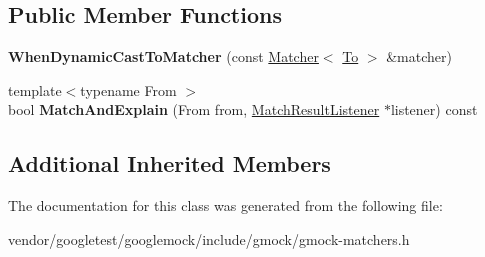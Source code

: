 \subsection*{Public Member Functions}
\begin{DoxyCompactItemize}
\item 
\mbox{\label{classtesting_1_1internal_1_1_when_dynamic_cast_to_matcher_a44e444d218197f8180c5ac7fca135f9a}} 
{\bfseries When\+Dynamic\+Cast\+To\+Matcher} (const \hyperlink{classtesting_1_1_matcher}{Matcher}$<$ \hyperlink{classtesting_1_1internal_1_1_to}{To} $>$ \&matcher)
\item 
\mbox{\label{classtesting_1_1internal_1_1_when_dynamic_cast_to_matcher_a270f6a1e6ad7c9b69fdefca27c513bf5}} 
{\footnotesize template$<$typename From $>$ }\\bool {\bfseries Match\+And\+Explain} (From from, \hyperlink{classtesting_1_1_match_result_listener}{Match\+Result\+Listener} $\ast$listener) const
\end{DoxyCompactItemize}
\subsection*{Additional Inherited Members}


The documentation for this class was generated from the following file\+:\begin{DoxyCompactItemize}
\item 
vendor/googletest/googlemock/include/gmock/gmock-\/matchers.\+h\end{DoxyCompactItemize}

